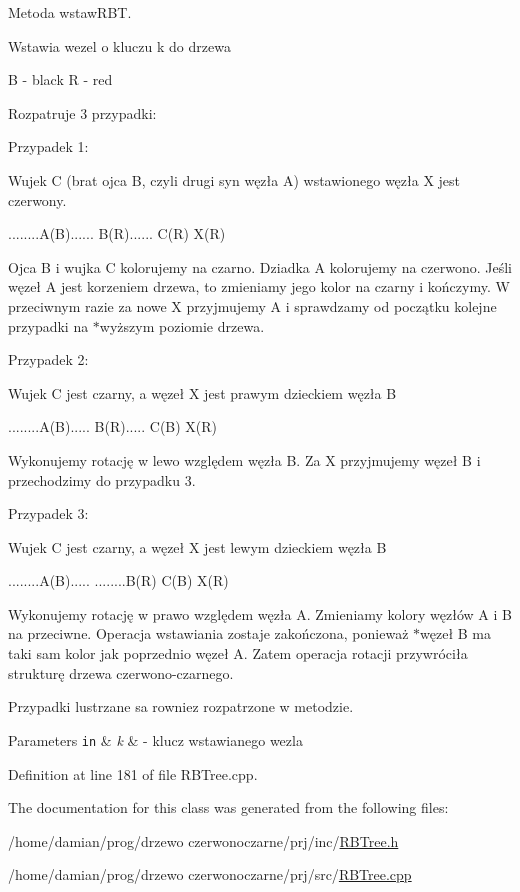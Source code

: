 Metoda wstaw\-R\-B\-T. 

Wstawia wezel o kluczu k do drzewa \begin{DoxyVerb}B - black   R - red 
\end{DoxyVerb}


Rozpatruje 3 przypadki\-: \begin{DoxyVerb}Przypadek 1:

    Wujek C (brat ojca B, czyli drugi syn węzła A) wstawionego węzła X jest czerwony.

                        ........A(B)......
                        B(R)......  C(R)
                            X(R)
\end{DoxyVerb}


Ojca B i wujka C kolorujemy na czarno. Dziadka A kolorujemy na czerwono. Jeśli węzeł A jest korzeniem drzewa, to zmieniamy jego kolor na czarny i kończymy. W przeciwnym razie za nowe X przyjmujemy A i sprawdzamy od początku kolejne przypadki na $\ast$wyższym poziomie drzewa. \begin{DoxyVerb}Przypadek 2:

    Wujek C jest czarny, a węzeł X jest prawym dzieckiem węzła B

                        ........A(B).....
                        B(R).....   C(B)
                            X(R)
\end{DoxyVerb}


Wykonujemy rotację w lewo względem węzła B. Za X przyjmujemy węzeł B i przechodzimy do przypadku 3. \begin{DoxyVerb}Przypadek 3:

    Wujek C jest czarny, a węzeł X jest lewym dzieckiem węzła B

                        ........A(B).....
                    ........B(R)        C(B)
                    X(R)
\end{DoxyVerb}


Wykonujemy rotację w prawo względem węzła A. Zmieniamy kolory węzłów A i B na przeciwne. Operacja wstawiania zostaje zakończona, ponieważ $\ast$węzeł B ma taki sam kolor jak poprzednio węzeł A. Zatem operacja rotacji przywróciła strukturę drzewa czerwono-\/czarnego.

Przypadki lustrzane sa rowniez rozpatrzone w metodzie.


\begin{DoxyParams}[1]{Parameters}
\mbox{\tt in}  & {\em k} & -\/ klucz wstawianego wezla \\
\hline
\end{DoxyParams}


Definition at line 181 of file R\-B\-Tree.\-cpp.



The documentation for this class was generated from the following files\-:\begin{DoxyCompactItemize}
\item 
/home/damian/prog/drzewo czerwonoczarne/prj/inc/\hyperlink{_r_b_tree_8h}{R\-B\-Tree.\-h}\item 
/home/damian/prog/drzewo czerwonoczarne/prj/src/\hyperlink{_r_b_tree_8cpp}{R\-B\-Tree.\-cpp}\end{DoxyCompactItemize}
